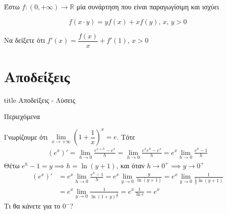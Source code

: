 \documentclass{presentation}
\begin{document}
\begin{askisi}
  Έστω $f:(0,+\infty)\to\mathbb{R}$ μία συνάρτηση που είναι παραγωγίσιμη και ισχύει

  $$f(x\cdot y)=yf(x)+xf(y) \text{, } x \text{, } y>0$$

  Να δείξετε ότι $f'(x)=\dfrac{f(x)}{x}+f'(1)$, $x>0$

\end{askisi}

\appendix
\section*{Αποδείξεις}

\begin{frame}[noframenumbering]
  \vfill
  \centering
  \begin{beamercolorbox}[sep=8pt,center,shadow=true,rounded=true]{title}
    Αποδείξεις - Λύσεις
  \end{beamercolorbox}
  \vfill
\end{frame}

\begin{frame}{Περιεχόμενα }
  \tableofcontents
\end{frame}

\begin{apodiksi}[$(e^x)'=e^x$]
  Γνωρίζουμε ότι $\lim\limits_{x \to +\infty}{ \left( 1+\dfrac{1}{x} \right)^x  }=e$. Τότε
  \begin{align*}
    (e^x)'=\lim\limits_{h \to 0}{ \frac{e^{x+h}-e^x}{h} }=\lim\limits_{h \to 0}{ \frac{e^xe^h-e^x}{h} }
    =e^x\lim\limits_{h \to 0}{ \frac{e^h-1}{h} }
  \end{align*}
  Θέτω $e^h-1=y\implies h=\ln (y+1)$, και όταν $h\to 0^+\implies y\to 0^+$
  \begin{align*}
    (e^x)' & =e^x\lim\limits_{h \to 0}{ \frac{e^h-1}{h} }
    =e^x\lim\limits_{y \to 0}{ \frac{y}{\ln(y+1)} }
    =e^x\lim\limits_{y \to 0}{ \frac{1}{\frac{1}{y}\ln(y+1)} }             \\
           & =e^x\lim\limits_{y \to 0}{ \frac{1}{\ln(1+y)^{\frac{1}{y}}} }
    =e^x \frac{1}{\ln e }=e^x
  \end{align*}
  Τι θα κάνετε για το $0^-$?

  \hyperlink{Θεωρία}{}
\end{apodiksi}
\end{document}
